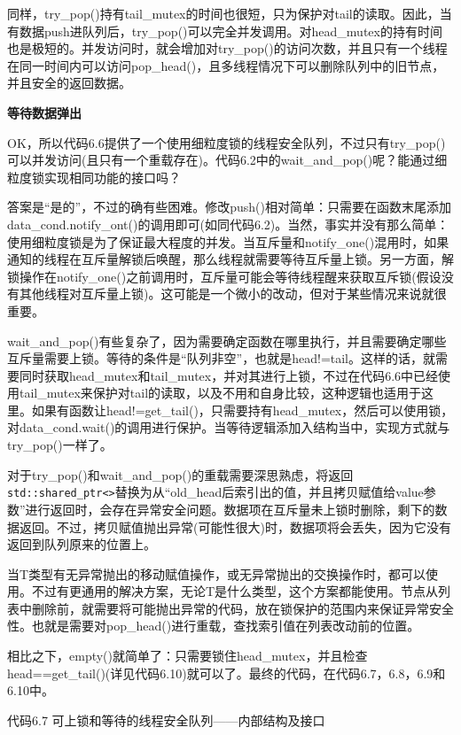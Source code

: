 同样，try\_pop()持有tail\_mutex的时间也很短，只为保护对tail的读取。因此，当有数据push进队列后，try\_pop()可以完全并发调用。对head\_mutex的持有时间也是极短的。并发访问时，就会增加对try\_pop()的访问次数，并且只有一个线程在同一时间内可以访问pop\_head()，且多线程情况下可以删除队列中的旧节点，并且安全的返回数据。

\textbf{等待数据弹出}

OK，所以代码6.6提供了一个使用细粒度锁的线程安全队列，不过只有try\_pop()可以并发访问(且只有一个重载存在)。代码6.2中的wait\_and\_pop()呢？能通过细粒度锁实现相同功能的接口吗？

答案是“是的”，不过的确有些困难。修改push()相对简单：只需要在函数末尾添加data\_cond.notify\_ont()的调用即可(如同代码6.2)。当然，事实并没有那么简单：使用细粒度锁是为了保证最大程度的并发。当互斥量和notify\_one()混用时，如果通知的线程在互斥量解锁后唤醒，那么线程就需要等待互斥量上锁。另一方面，解锁操作在notify\_one()之前调用时，互斥量可能会等待线程醒来获取互斥锁(假设没有其他线程对互斥量上锁)。这可能是一个微小的改动，但对于某些情况来说就很重要。

wait\_and\_pop()有些复杂了，因为需要确定函数在哪里执行，并且需要确定哪些互斥量需要上锁。等待的条件是“队列非空”，也就是head!=tail。这样的话，就需要同时获取head\_mutex和tail\_mutex，并对其进行上锁，不过在代码6.6中已经使用tail\_mutex来保护对tail的读取，以及不用和自身比较，这种逻辑也适用于这里。如果有函数让head!=get\_tail()，只需要持有head\_mutex，然后可以使用锁，对data\_cond.wait()的调用进行保护。当等待逻辑添加入结构当中，实现方式就与try\_pop()一样了。

对于try\_pop()和wait\_and\_pop()的重载需要深思熟虑，将返回\texttt{std::shared\_ptr<>}替换为从“old\_head后索引出的值，并且拷贝赋值给value参数”进行返回时，会存在异常安全问题。数据项在互斥量未上锁时删除，剩下的数据返回。不过，拷贝赋值抛出异常(可能性很大)时，数据项将会丢失，因为它没有返回到队列原来的位置上。

当T类型有无异常抛出的移动赋值操作，或无异常抛出的交换操作时，都可以使用。不过有更通用的解决方案，无论T是什么类型，这个方案都能使用。节点从列表中删除前，就需要将可能抛出异常的代码，放在锁保护的范围内来保证异常安全性。也就是需要对pop\_head()进行重载，查找索引值在列表改动前的位置。

相比之下，empty()就简单了：只需要锁住head\_mutex，并且检查head==get\_tail()(详见代码6.10)就可以了。最终的代码，在代码6.7，6.8，6.9和6.10中。

代码6.7 可上锁和等待的线程安全队列——内部结构及接口

